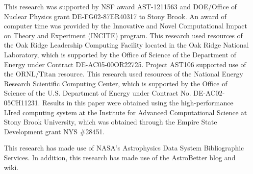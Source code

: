 \documentclass[twocolumn,numberedappendix]{../aastex6}
\begin{document}
This research was supported by NSF award AST-1211563 and DOE/Office of
Nuclear Physics grant DE-FG02-87ER40317 to Stony Brook. An award of
computer time was provided by the Innovative and Novel Computational
Impact on Theory and Experiment (INCITE) program.  This research used
resources of the Oak Ridge Leadership Computing Facility located in
the Oak Ridge National Laboratory, which is supported by the Office of
Science of the Department of Energy under Contract
DE-AC05-00OR22725. Project AST106 supported use of the ORNL/Titan
resource.  This research used resources of the National Energy
Research Scientific Computing Center, which is supported by the Office
of Science of the U.S. Department of Energy under Contract
No. DE-AC02-05CH11231.  Results in this paper were obtained using the
high-performance LIred computing system at the Institute for Advanced
Computational Science at Stony Brook University, which was obtained
through the Empire State Development grant NYS \#28451.

This research has made use of NASA's Astrophysics Data System 
Bibliographic Services. In addition, this research has made use
of the AstroBetter blog and wiki.

\clearpage





\clearpage
\appendix
\end{document}
